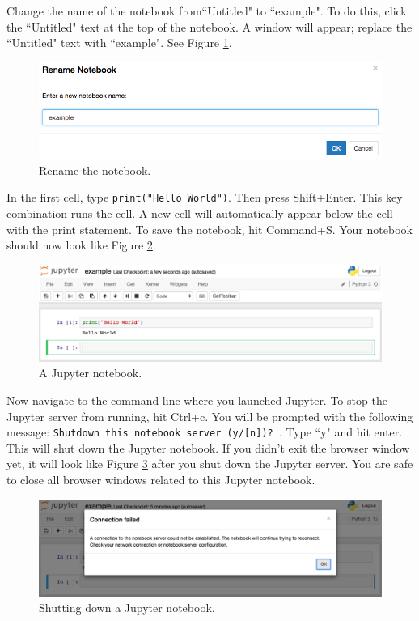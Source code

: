 \documentclass[11pt,a4paper]{article}
\begin{document}
Change the name of the notebook from``Untitled" to ``example".
To do this, click the ``Untitled" text at the top of the notebook.
A window will appear; replace the ``Untitled" text with ``example".
See Figure \ref{fig:rename-notebook}.

\begin{figure}[h]
\centering
\includegraphics[width=.7\textwidth]{figures/rename_notebook.png}
\caption{Rename the notebook.}
\label{fig:rename-notebook}
\end{figure}

In the first cell, type \texttt{print("Hello World")}.
Then press Shift+Enter.
This key combination runs the cell.
A new cell will automatically appear below the cell with the print statement.
To save the notebook, hit Command+S.
Your notebook should now look like Figure \ref{fig:example-notebook}.

\begin{figure}[h]
\centering
\includegraphics[width=.7\textwidth]{figures/example_notebook.png}
\caption{A Jupyter notebook.}
\label{fig:example-notebook}
\end{figure}

Now navigate to the command line where you launched Jupyter.
To stop the Jupyter server from running, hit Ctrl+c.
You will be prompted with the following message: \texttt{Shutdown this notebook server (y/[n])? }.
Type ``y" and hit enter.
This will shut down the Jupyter notebook.
If you didn't exit the browser window yet, it will look like Figure \ref{fig:jupyter-shutdown} after you shut down the Jupyter server.
You are safe to close all browser windows related to this Jupyter notebook.

\begin{figure}[h]
\centering
\includegraphics[width=.7\textwidth]{figures/jupyter_shutdown.png}
\caption{Shutting down a Jupyter notebook.}
\label{fig:jupyter-shutdown}
\end{figure}
\end{document}
